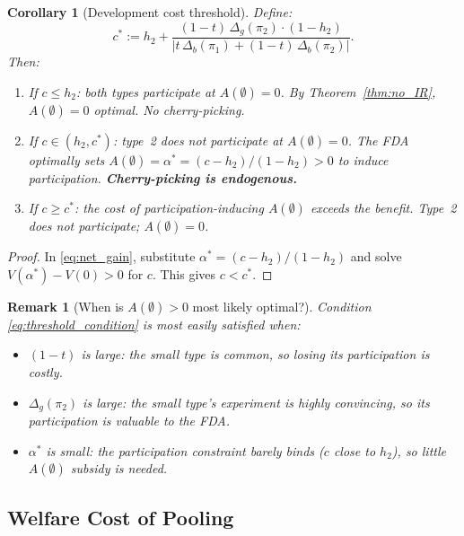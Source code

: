 \documentclass[12pt,a4paper]{article}
\newtheorem{remark}{Remark}
\newtheorem{corollary}{Corollary}
\begin{document}
\begin{corollary}[Development cost threshold]
\label{cor:threshold}
Define:
\begin{equation}\label{eq:cstar}
  c^* := h_2
  + \frac{(1-t) \, \Delta_g(\pi_2) \cdot (1 - h_2)}
         {\bigl|t \, \Delta_b(\pi_1)
           + (1-t) \, \Delta_b(\pi_2)\bigr|}.
\end{equation}
Then:
\begin{enumerate}
  \item[(i)] If $c \leq h_2$: both types participate at
    $A(\emptyset) = 0$. By Theorem~\ref{thm:no_IR},
    $A(\emptyset) = 0$ optimal. No cherry-picking.
  \item[(ii)] If $c \in (h_2, c^*)$: type~2 does not
    participate at $A(\emptyset) = 0$. The FDA optimally
    sets $A(\emptyset) = \alpha^* = (c - h_2)/(1-h_2) > 0$
    to induce participation. \textbf{Cherry-picking
    is endogenous.}
  \item[(iii)] If $c \geq c^*$: the cost of
    participation-inducing $A(\emptyset)$ exceeds the
    benefit. Type~2 does not participate; $A(\emptyset) = 0$.
\end{enumerate}
\end{corollary}

\begin{proof}
In \eqref{eq:net_gain}, substitute
$\alpha^* = (c - h_2)/(1-h_2)$ and solve
$V(\alpha^*) - V(0) > 0$ for $c$. This gives $c < c^*$.
\end{proof}

\begin{remark}[When is $A(\emptyset) > 0$ most likely
  optimal?]
Condition \eqref{eq:threshold_condition} is most easily
satisfied when:
\begin{itemize}
  \item $(1-t)$ is large: the small type is common, so
    losing its participation is costly.
  \item $\Delta_g(\pi_2)$ is large: the small type's
    experiment is highly convincing, so its participation
    is valuable to the FDA.
  \item $\alpha^*$ is small: the participation constraint
    barely binds ($c$ close to $h_2$), so little
    $A(\emptyset)$ subsidy is needed.
\end{itemize}
\end{remark}


\subsection{Welfare Cost of Pooling}
\label{sec:welfare}
\end{document}
